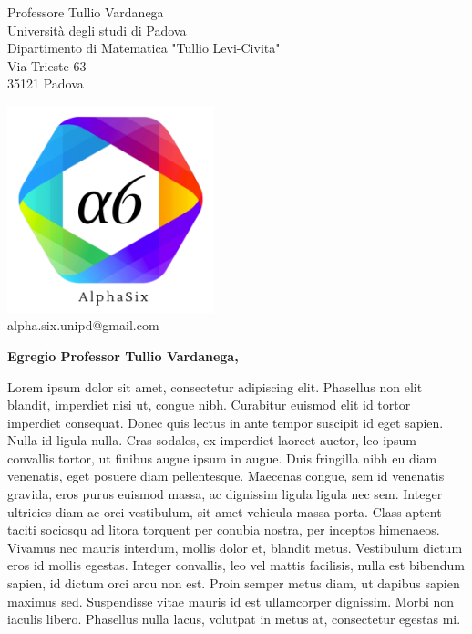 \documentclass[12pt]{letter} %
\begin{document}

	\begin{letter}{Professore Tullio Vardanega \\ Università degli studi di Padova \\ Dipartimento di Matematica "Tullio Levi-Civita" \\ Via Trieste 63 \\ 35121 Padova} %

	\begin{center}
		\includegraphics[width=6cm]{../template/icons/a6.png}
		\\ alpha.six.unipd@gmail.com
	\end{center}

	\opening{\textbf{Egregio Professor Tullio Vardanega,}}

	\begin{addmargin}[2em]{2em}
		\hspace{1cm} %
		Lorem ipsum dolor sit amet, consectetur adipiscing elit. Phasellus non elit blandit, imperdiet nisi ut, congue nibh. Curabitur euismod elit id tortor imperdiet consequat. Donec quis lectus in ante tempor suscipit id eget sapien. Nulla id ligula nulla. Cras sodales, ex imperdiet laoreet auctor, leo ipsum convallis tortor, ut finibus augue ipsum in augue. Duis fringilla nibh eu diam venenatis, eget posuere diam pellentesque. Maecenas congue, sem id venenatis gravida, eros purus euismod massa, ac dignissim ligula ligula nec sem. Integer ultricies diam ac orci vestibulum, sit amet vehicula massa porta. Class aptent taciti sociosqu ad litora torquent per conubia nostra, per inceptos himenaeos. Vivamus nec mauris interdum, mollis dolor et, blandit metus. Vestibulum dictum eros id mollis egestas. Integer convallis, leo vel mattis facilisis, nulla est bibendum sapien, id dictum orci arcu non est. Proin semper metus diam, ut dapibus sapien maximus sed. Suspendisse vitae mauris id est ullamcorper dignissim. Morbi non iaculis libero. Phasellus nulla lacus, volutpat in metus at, consectetur egestas mi.


\end{addmargin}
\end{letter}
\end{document}
